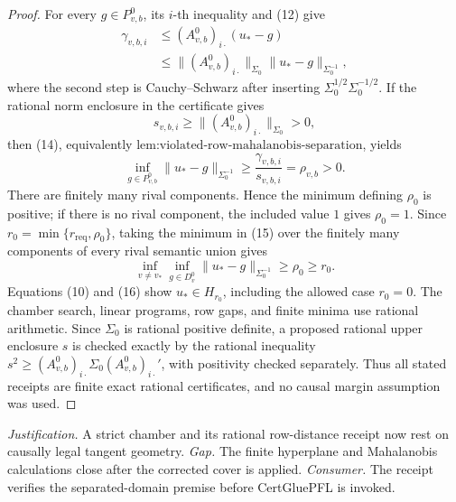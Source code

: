 \documentclass{article}
\begin{document}
\begin{proof}
For every \(g\in P_{v,b}^0\), its \(i\)-th inequality and (12) give
\[
 \begin{aligned}
 \gamma_{v,b,i}
 &\leq (A_{v,b}^0)_{i\cdot}(u_*-g)\\
 &\leq
 \|(A_{v,b}^0)_{i\cdot}\|_{\Sigma_0}
 \|u_*-g\|_{\Sigma_0^{-1}},
 \end{aligned}
\tag{14}
\]
where the second step is Cauchy--Schwarz after inserting
\(\Sigma_0^{1/2}\Sigma_0^{-1/2}\).  If the rational norm enclosure in
the certificate gives
\[
 s_{v,b,i}\geq
 \|(A_{v,b}^0)_{i\cdot}\|_{\Sigma_0}>0,
\]
then (14), equivalently
\(\text{lem:violated-row-mahalanobis-separation}\), yields
\[
 \inf_{g\in P_{v,b}^0}
 \|u_*-g\|_{\Sigma_0^{-1}}
 \geq
 \frac{\gamma_{v,b,i}}{s_{v,b,i}}
 =\rho_{v,b}>0.
\tag{15}
\]
There are finitely many rival components.  Hence the minimum defining
\(\rho_0\) is positive; if there is no rival component, the included
value \(1\) gives \(\rho_0=1\).  Since
\(r_0=\min\{r_{\mathrm{req}},\rho_0\}\), taking the minimum in (15)
over the finitely many components of every rival semantic union gives
\[
 \inf_{v\ne v_*}\inf_{g\in D_v^0}
 \|u_*-g\|_{\Sigma_0^{-1}}
 \geq\rho_0\geq r_0.
\tag{16}
\]
Equations (10) and (16) show \(u_*\in H_{r_0}\), including the allowed
case \(r_0=0\).  The chamber search, linear programs, row gaps, and
finite minima use rational arithmetic.  Since \(\Sigma_0\) is rational
positive definite, a proposed rational upper enclosure \(s\) is
checked exactly by the rational inequality
\(s^2\geq (A_{v,b}^0)_{i\cdot}\Sigma_0
(A_{v,b}^0)_{i\cdot}'\), with positivity checked separately.
Thus all stated receipts are finite exact rational certificates, and
no causal margin assumption was used.
\end{proof}
\par\smallskip\noindent \textit{Justification.} A strict chamber and its rational row-distance receipt now rest on causally legal tangent geometry. \textit{Gap.} The finite hyperplane and Mahalanobis calculations close after the corrected cover is applied. \textit{Consumer.} The receipt verifies the separated-domain premise before CertGluePFL is invoked.
\end{document}
